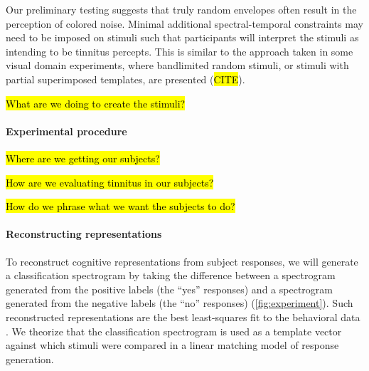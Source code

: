 \documentclass[11pt, notitlepage]{article} %
\begin{document}
Our preliminary testing suggests that truly random envelopes
often result in the perception of colored noise.
Minimal additional spectral-temporal constraints may need to be imposed on stimuli
such that participants will interpret the stimuli as intending to be tinnitus percepts.
This is similar to the approach taken in some visual domain experiments,
where bandlimited random stimuli, or stimuli with partial superimposed templates,
are presented \cite{smithMeasuringInternalRepresentations2012} (\hl{CITE}).

\hl{What are we doing to create the stimuli?}


\paragraph{Experimental procedure}

\hl{Where are we getting our subjects?}

\hl{How are we evaluating tinnitus in our subjects?}

\hl{How do we phrase what we want the subjects to do?}


\paragraph{Reconstructing representations}

To reconstruct cognitive representations from subject responses,
we will generate a classification spectrogram by taking the difference
between a spectrogram generated from the positive labels (the ``yes'' responses)
and a spectrogram generated from the negative labels (the ``no'' responses)
(\autoref{fig:experiment}).
Such reconstructed representations are the best least-squares fit to the behavioral data
\cite{gosselinSuperstitiousPerceptionsReveal2003}.
We theorize that the classification spectrogram is used as a template vector
against which stimuli were compared in a linear matching model of response generation.
\end{document}
